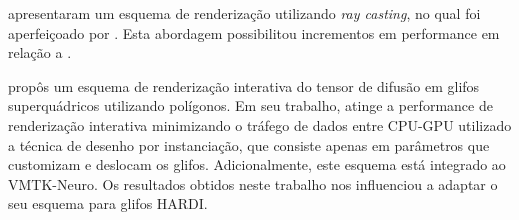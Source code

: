 \documentclass[
    12pt,                %
    oneside,            %
    a4paper,            %
    english,            %
    french,                %
    spanish,            %
    brazil                %
    ]{abntex2}
\begin{document}
 apresentaram um esquema de renderização utilizando \textit{ray casting}, no qual foi aperfeiçoado por \cite{peeters2011}. Esta abordagem possibilitou incrementos em performance em relação a .

 propôs um esquema de renderização interativa do tensor de difusão em glifos superquádricos \cite{Kindlmann2004} utilizando polígonos. Em seu trabalho, atinge a performance de renderização interativa minimizando o tráfego de dados entre CPU-GPU utilizado a técnica de desenho por instanciação, que consiste apenas em parâmetros que customizam e deslocam os glifos. Adicionalmente, este esquema está integrado ao VMTK-Neuro. Os resultados obtidos neste trabalho nos influenciou a adaptar o seu esquema para glifos HARDI.












\end{document}
